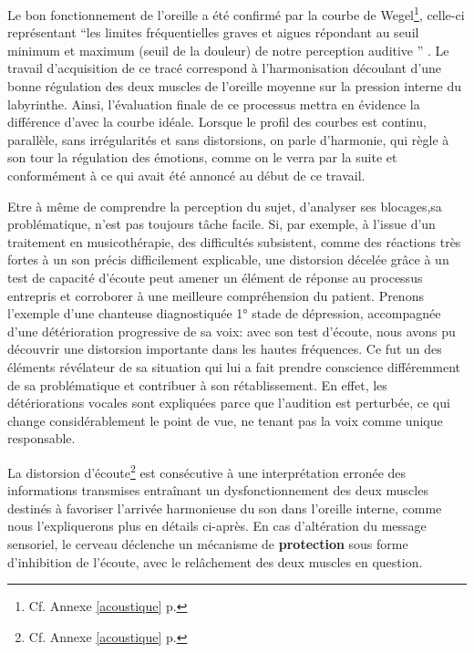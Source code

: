 Le bon fonctionnement de l'oreille a été confirmé par la courbe
de Wegel\footnote{Cf. Annexe \ref{acoustique} p. \pageref{acoustique}}, celle-ci représentant   \enquote 
{les limites fréquentielles graves et 
aigues répondant au seuil 
minimum et maximum (seuil de la douleur) de notre perception auditive } 
\autocite{Tomatislangage}.
 Le travail d'acquisition de ce tracé correspond à l'harmonisation
découlant d'une bonne régulation des deux muscles de l'oreille moyenne
sur la pression interne du
labyrinthe.
Ainsi, l'évaluation finale de ce processus mettra en évidence la différence
d'avec la courbe idéale.
Lorsque le profil des
courbes est continu, parallèle, sans irrégularités et sans
distorsions, on parle d'harmonie, qui règle à son tour
la régulation des émotions, comme on le verra par la suite et conformément à
ce qui avait été annoncé au début de ce travail.


Etre à même de comprendre la perception du sujet, d'analyser ses blocages,sa problématique, 
n'est pas toujours tâche facile.
Si, par exemple, à l'issue d'un traitement en musicothérapie, des difficultés subsistent, comme des 
réactions très 
fortes à un son précis difficilement explicable,  une distorsion décelée grâce à un test 
de capacité d'écoute peut amener un élément de réponse au processus entrepris et corroborer à une 
meilleure  
compréhension du patient.   
Prenons  l'exemple d'une chanteuse diagnostiquée 1° stade de dépression, accompagnée d'une 
détérioration progressive de sa voix:  avec son test d'écoute, nous avons pu découvrir une distorsion 
importante dans les hautes fréquences. Ce fut un des éléments révélateur de sa situation qui lui a fait 
prendre conscience différemment  de sa problématique et contribuer à son rétablissement.
En effet, les détériorations vocales sont expliquées parce que l'audition est perturbée, ce qui change 
considérablement le point de vue, ne tenant pas la voix comme unique responsable. 


 La distorsion d'écoute\footnote {Cf. Annexe \ref{acoustique} p. \pageref{acoustique}} %
 est consécutive à une interprétation
erronée des informations transmises entraînant un dysfonctionnement
des deux muscles destinés à favoriser l'arrivée
harmonieuse du son dans l'oreille interne, comme nous l'expliquerons plus en détails ci-après.
En cas d'altération du message sensoriel,
le cerveau déclenche un mécanisme de\textbf{ protection} sous forme
d'inhibition de l'écoute, avec le relâchement des deux muscles en
question. 

